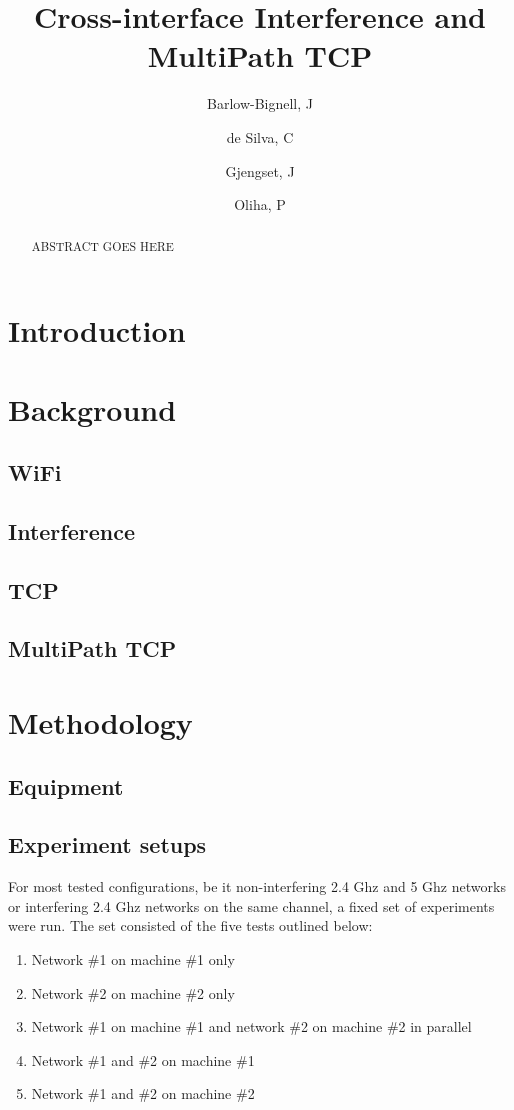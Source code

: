 \documentclass[12pt,a4paper]{article}
\title{Cross-interface Interference and MultiPath TCP}
\author{Barlow-Bignell, J}
\author{de Silva, C}
\author{Gjengset, J}
\author{Oliha, P}
\affil{University College London}
\date{}
\begin{document}
\maketitle

\begin{abstract}
  ABSTRACT GOES HERE
\end{abstract}
\clearpage

\section{Introduction}

\section{Background}
\subsection{WiFi}
\subsection{Interference}
\subsection{TCP}
\subsection{MultiPath TCP}

\section{Methodology}
\subsection{Equipment}
\subsection{Experiment setups}
For most tested configurations, be it non-interfering 2.4 Ghz and 5 Ghz networks
or interfering 2.4 Ghz networks on the same channel, a fixed set of experiments
were run. The set consisted of the five tests outlined below:

\begin{enumerate}
  \item Network \#1 on machine \#1 only
  \item Network \#2 on machine \#2 only
  \item Network \#1 on machine \#1 and network \#2 on machine \#2 in parallel
  \item Network \#1 and \#2 on machine \#1
  \item Network \#1 and \#2 on machine \#2
\end{enumerate}
\end{document}
